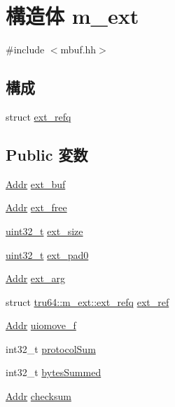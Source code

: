 \hypertarget{structtru64_1_1m__ext}{
\section{構造体 m\_\-ext}
\label{structtru64_1_1m__ext}
}


{\ttfamily \#include $<$mbuf.hh$>$}\subsection*{構成}
\begin{DoxyCompactItemize}
\item 
struct \hyperlink{structtru64_1_1m__ext_1_1ext__refq}{ext\_\-refq}
\end{DoxyCompactItemize}
\subsection*{Public 変数}
\begin{DoxyCompactItemize}
\item 
\hyperlink{base_2types_8hh_af1bb03d6a4ee096394a6749f0a169232}{Addr} \hyperlink{structtru64_1_1m__ext_a0cf0cfd509c386acd819af53d9e1e544}{ext\_\-buf}
\item 
\hyperlink{base_2types_8hh_af1bb03d6a4ee096394a6749f0a169232}{Addr} \hyperlink{structtru64_1_1m__ext_a6e5005ddf0a8a3f38e525da542b7cbb3}{ext\_\-free}
\item 
\hyperlink{Type_8hh_a435d1572bf3f880d55459d9805097f62}{uint32\_\-t} \hyperlink{structtru64_1_1m__ext_a519071384305eb6392efc1e892306389}{ext\_\-size}
\item 
\hyperlink{Type_8hh_a435d1572bf3f880d55459d9805097f62}{uint32\_\-t} \hyperlink{structtru64_1_1m__ext_a087be88aca54d6d893ebec56314e32ed}{ext\_\-pad0}
\item 
\hyperlink{base_2types_8hh_af1bb03d6a4ee096394a6749f0a169232}{Addr} \hyperlink{structtru64_1_1m__ext_aa576886f65b2516839429f320bf1a173}{ext\_\-arg}
\item 
struct \hyperlink{structtru64_1_1m__ext_1_1ext__refq}{tru64::m\_\-ext::ext\_\-refq} \hyperlink{structtru64_1_1m__ext_af1925993078a0dc9e8557ca1acec6d0d}{ext\_\-ref}
\item 
\hyperlink{base_2types_8hh_af1bb03d6a4ee096394a6749f0a169232}{Addr} \hyperlink{structtru64_1_1m__ext_a4a94b76a1b4e681dbfe7cd62507cfd50}{uiomove\_\-f}
\item 
int32\_\-t \hyperlink{structtru64_1_1m__ext_a04669846c1174fea5ec850923fbab711}{protocolSum}
\item 
int32\_\-t \hyperlink{structtru64_1_1m__ext_a2148f5572c0bfef45a5852c6d7dac9d8}{bytesSummed}
\item 
\hyperlink{base_2types_8hh_af1bb03d6a4ee096394a6749f0a169232}{Addr} \hyperlink{structtru64_1_1m__ext_ae1cf3d83321e8298b3a61ed3e7425187}{checksum}
\end{DoxyCompactItemize}


